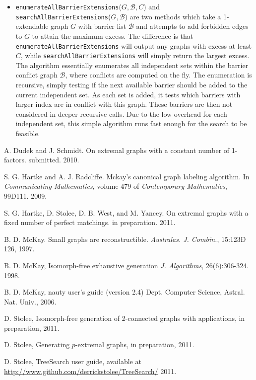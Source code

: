 \documentclass[11pt]{article}
\begin{document}
\begin{itemize}
	\item \texttt{enumerateAllBarrierExtensions}($G, {\mathcal B}, C$) 
		and \texttt{searchAllBarrierExtensions}($G, {\mathcal B}$)
		are two methods which take a 1-extendable graph $G$ with barrier list $\mathcal B$
		and attempts to add forbidden edges to $G$ to attain the maximum excess.
		The difference is that \texttt{enumerateAllBarrierExtensions} will
			output any graphs with excess at least $C$, 
			while \texttt{searchAllBarrierExtensions} will simply return the largest excess.
		The algorithm essentially enumerates all independent sets within
			the barrier conflict graph ${\mathcal B}$, where
			conflicts are computed on the fly.
		The enumeration is recursive, simply testing if
			the next available barrier should be added to the current independent set.
		As each set is added, it tests which barriers 
			with larger index are in conflict with this graph.
		These barriers are then not considered in deeper recursive calls.
		Due to the low overhead for each independent set, this
			simple algorithm runs fast enough for the search to be feasible.
\end{itemize}



\begin{thebibliography}{9}
	 A. Dudek and J. Schmidt.
		On extremal graphs with a constant number of 1-factors.
		submitted. 2010.

	 S. G. Hartke and A. J. Radcliffe. 
		Mckay's canonical graph labeling algorithm. 
		In {\it Communicating Mathematics}, 
		volume 479 of {\it Contemporary Mathematics}, 99Ð111. 2009.
		
	 S. G. Hartke, D. Stolee, D. B. West, and M. Yancey.
		On extremal graphs with a fixed number of perfect matchings.
		in preparation. 2011.

	 B. D. McKay. Small graphs are reconstructible. 
		{\it Australas. J. Combin.}, 15:123Ð 126, 1997.

	 B. D. McKay, 
		Isomorph-free exhaustive generation
		{\it J. Algorithms}, 26(6):306-324. 1998.
		
	 B. D. McKay,
		nauty user's guide (version 2.4)
		Dept. Computer Science, Astral. Nat. Univ., 2006.
	
	 D. Stolee, 
		Isomorph-free generation of 2-connected graphs with applications,
		in preparation, 2011.
		
	 D. Stolee,
		Generating $p$-extremal graphs,
		in preparation, 2011.
		
	 D. Stolee,
		TreeSearch user guide,
		available at 
		\href{http://www.github.com/derrickstolee/TreeSearch/}{http://www.github.com/derrickstolee/TreeSearch/}
		2011.
\end{thebibliography}
\end{document}
